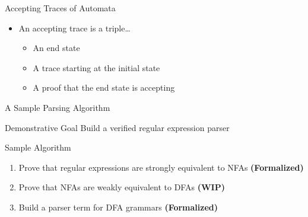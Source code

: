 \documentclass[10pt]{beamer}
\begin{document}
\begin{frame}{Accepting Traces of Automata}
\begin{minipage}{.5\textwidth}
      \begin{itemize}
        \item<6-> An accepting trace is a triple\dots
        \begin{itemize}
          \item<7-> \alert<7>{An end state}
          \item<8-> \alert<8>{A trace starting at the initial state}
          \item<9-> \alert<9>{A proof that the end state is accepting}
        \end{itemize}
      \end{itemize}
    \end{minipage}%
\end{frame}

\begin{frame}{A Sample Parsing Algorithm}
  \begin{alertblock}{Demonstrative Goal}
  Build a verified regular expression parser
  \end{alertblock}
  \begin{block}{Sample Algorithm}
    \begin{enumerate}
      \item Prove that regular expressions are strongly equivalent to NFAs \textbf{(Formalized)}
      \item Prove that NFAs are weakly equivalent to DFAs \textbf{(WIP)}
      \item Build a parser term for DFA grammars \textbf{(Formalized)}
    \end{enumerate}
  \end{block}
\end{frame}
\end{document}
